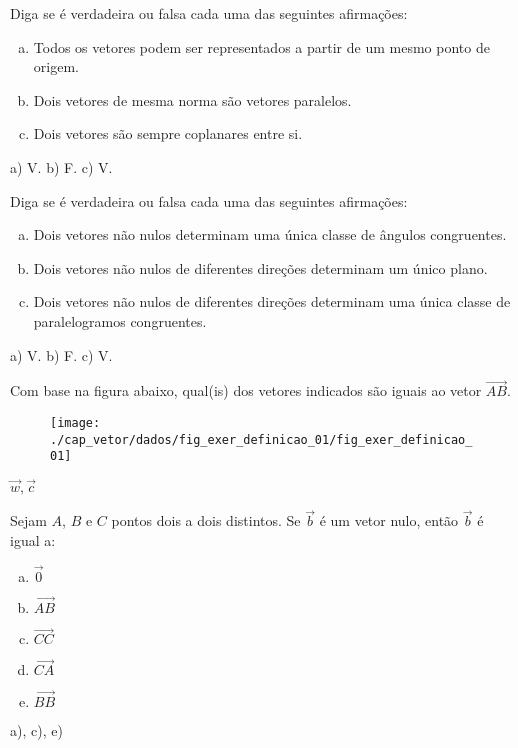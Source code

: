 \begin{exer}
  Diga se é verdadeira ou falsa cada uma das seguintes afirmações:
  \begin{enumerate}[a)]
    \item Todos os vetores podem ser representados a partir de um mesmo ponto de origem.
    \item Dois vetores de mesma norma são vetores paralelos.
    \item Dois vetores são sempre coplanares entre si.
  \end{enumerate}
\end{exer}
\begin{resp}
  a) V. b) F. c) V.
\end{resp}

\begin{exer}
  Diga se é verdadeira ou falsa cada uma das seguintes afirmações:
  \begin{enumerate}[a)]
    \item Dois vetores não nulos determinam uma única classe de ângulos congruentes.
    \item Dois vetores não nulos de diferentes direções determinam um único plano.
    \item Dois vetores não nulos de diferentes direções determinam uma única classe de paralelogramos congruentes.
  \end{enumerate}
\end{exer}
\begin{resp}
  a) V. b) F. c) V.
\end{resp}

\begin{exer}
  Com base na figura abaixo, qual(is) dos vetores indicados são iguais ao vetor $\overrightarrow{AB}$.
  \begin{figure}[H]
    \centering
    \texttt{[image: ./cap\_vetor/dados/fig\_exer\_definicao\_01/fig\_exer\_definicao\_01]}
  \end{figure}
\end{exer}
\begin{resp}
  $\vec{w}, \vec{c}$
\end{resp}

\begin{exer}
  Sejam $A$, $B$ e $C$ pontos dois a dois distintos. Se $\vec{b}$ é um vetor nulo, então $\vec{b}$ é igual a:
  \begin{enumerate}[a)]
  \item $\vec{0}$
  \item $\overrightarrow{AB}$
  \item $\overrightarrow{CC}$
  \item $\overrightarrow{CA}$
  \item $\overrightarrow{BB}$
  \end{enumerate}
\end{exer}
\begin{resp}
  a), c), e) 
\end{resp}

